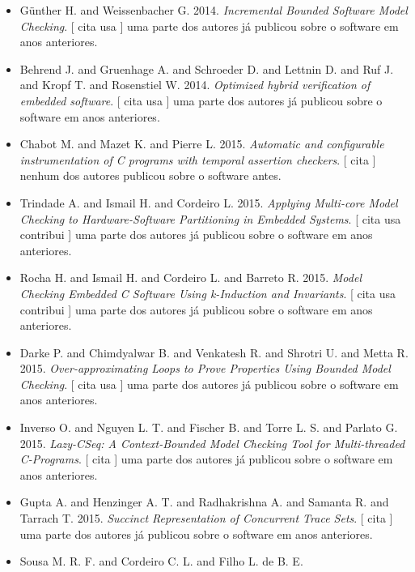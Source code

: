 \begin{itemize}
\item G\"{u}nther H. and Weissenbacher G.
      2014.
        \textit{ Incremental Bounded Software Model Checking}.
      [
          cita
          usa
      ]
uma parte dos autores já publicou sobre o software em anos anteriores.
\item Behrend J. and Gruenhage A. and Schroeder D. and Lettnin D. and Ruf J. and Kropf T. and Rosenstiel W.
      2014.
        \textit{ Optimized hybrid verification of embedded software}.
      [
          cita
          usa
      ]
uma parte dos autores já publicou sobre o software em anos anteriores.
\item Chabot M. and Mazet K. and Pierre L.
      2015.
        \textit{ Automatic and configurable instrumentation of C programs with temporal assertion checkers}.
      [
          cita
      ]
nenhum dos autores publicou sobre o software antes.
\item Trindade A. and Ismail H. and Cordeiro L.
      2015.
        \textit{ Applying Multi-core Model Checking to Hardware-Software Partitioning in Embedded Systems}.
      [
          cita
          usa
          contribui
      ]
uma parte dos autores já publicou sobre o software em anos anteriores.
\item Rocha H. and Ismail H. and Cordeiro L. and Barreto R.
      2015.
        \textit{ Model Checking Embedded C Software Using k-Induction and Invariants}.
      [
          cita
          usa
          contribui
      ]
uma parte dos autores já publicou sobre o software em anos anteriores.
\item Darke P. and Chimdyalwar B. and Venkatesh R. and Shrotri U. and Metta R.
      2015.
        \textit{ Over-approximating Loops to Prove Properties Using Bounded Model Checking}.
      [
          cita
          usa
      ]
uma parte dos autores já publicou sobre o software em anos anteriores.
\item Inverso O. and Nguyen L. T. and Fischer B. and Torre L. S. and Parlato G.
      2015.
        \textit{ Lazy-CSeq: A Context-Bounded Model Checking Tool for Multi-threaded C-Programs}.
      [
          cita
      ]
uma parte dos autores já publicou sobre o software em anos anteriores.
\item Gupta A. and Henzinger A. T. and Radhakrishna A. and Samanta R. and Tarrach T.
      2015.
        \textit{ Succinct Representation of Concurrent Trace Sets}.
      [
          cita
      ]
uma parte dos autores já publicou sobre o software em anos anteriores.
\item Sousa M. R. F. and Cordeiro C. L. and Filho L. de B. E.

\end{itemize}
